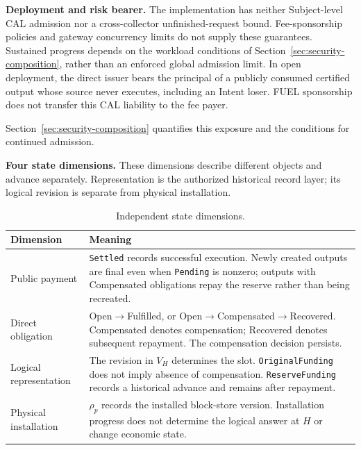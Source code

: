 \noindent\textbf{Deployment and risk bearer.}
The implementation has neither Subject-level CAL admission nor a
cross-collector unfinished-request bound. Fee-sponsorship policies and
gateway concurrency limits do not supply these guarantees. Sustained
progress depends on the workload conditions of
Section~\ref{sec:security-composition}, rather than an enforced global
admission limit. In open deployment, the direct issuer bears the
principal of a publicly consumed certified output whose source never
executes, including an Intent loser. FUEL sponsorship does not transfer
this CAL liability to the fee payer.

Section~\ref{sec:security-composition} quantifies this exposure and the conditions for continued admission.


\noindent\textbf{Four state dimensions.}
These dimensions describe different objects and advance separately. Representation is the authorized historical record layer; its logical revision is separate from physical installation.

\begin{table}[!t]
\caption{Independent state dimensions.}
\label{tab:model-states}
\centering\small
\setlength{\tabcolsep}{3pt}
\begin{tabular}{@{}p{}p{}@{}}
\toprule
Dimension & Meaning \\
\midrule
Public payment &
\texttt{Settled} records successful execution. Newly created outputs are final even when \texttt{Pending} is nonzero; outputs with Compensated obligations repay the reserve rather than being recreated. \\

Direct obligation &
Open$\to$Fulfilled, or Open$\to$Compensated$\to$Recovered.
Compensated denotes compensation; Recovered denotes subsequent repayment.
The compensation decision persists. \\

Logical representation &
The revision in $V_H$ determines the slot.
\texttt{OriginalFunding} does not imply absence of compensation.
\texttt{ReserveFunding} records a historical advance and remains
after repayment. \\

Physical installation &
$\rho_p$ records the installed block-store version.
Installation progress does not determine the logical answer at $H$
or change economic state. \\
\bottomrule
\end{tabular}
\end{table}

